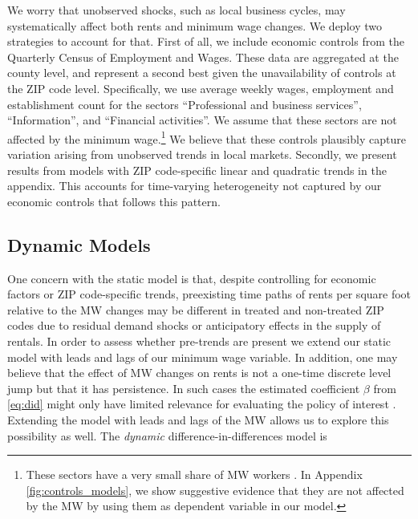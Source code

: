 
We worry that unobserved shocks, such as local business cycles, may systematically 
affect both rents and minimum wage changes. We deploy two strategies to account 
for that. First of all, we include economic controls from the Quarterly Census of 
Employment and Wages. These data are aggregated at the county level, and represent a 
second best given the unavailability of controls at the ZIP code level. Specifically, we 
use average weekly wages, employment and establishment count for the sectors 
``Professional and business services'', ``Information'', and ``Financial activities''. 
We assume that these sectors are not affected by the minimum wage.\footnote{These sectors 
	have a very small share of MW workers \parencite[][table 5]{MinWorkersReportBLS}. 
	In Appendix \autoref{fig:controls_models}, we show 
	suggestive evidence that they are not affected by the MW by using them as dependent 
	variable in our model.}
We believe that these controls plausibly capture variation arising from unobserved trends 
in local markets. Secondly, we present results from models with ZIP code-specific linear 
and quadratic trends in the appendix. This accounts for time-varying heterogeneity not 
captured by our economic controls that follows this pattern.

\subsection{Dynamic Models}

One concern with the static model is that, despite controlling for economic 
factors or ZIP code-specific trends, preexisting time paths of rents per square foot relative to the MW 
changes may  be different in treated and non-treated ZIP codes due to residual demand 
shocks or anticipatory effects in the supply of rentals. In order to assess whether pre-trends are 
present we extend our static model with leads and lags of our minimum wage variable. 
In addition, one may believe that the effect of MW changes on rents is not a one-time discrete level 
jump but that it has persistence. In such cases the estimated coefficient $\beta$ from 
\autoref{eq:did} might only have limited relevance for evaluating the policy of interest 
\parencite{callaway2019}. Extending the model with leads and lags of the MW allows us to 
explore this possibility as well. The \textit{dynamic} difference-in-differences model is

